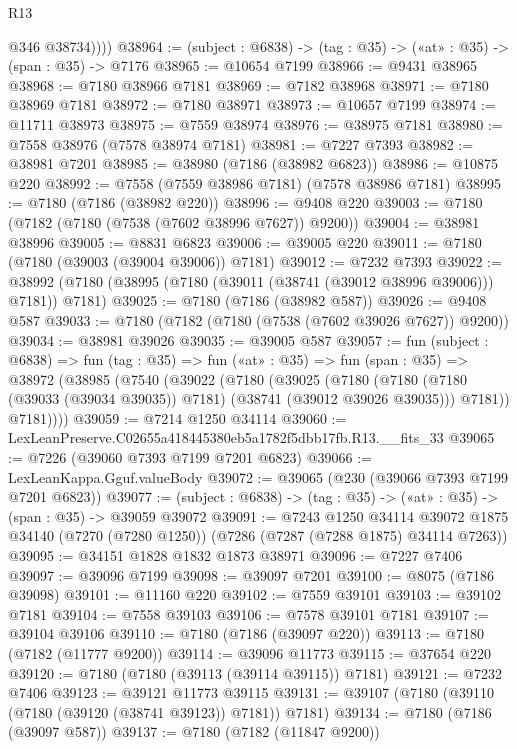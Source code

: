 \begin{lexlean}{R13}
\begin{coremodule}
            @346
            @38734))))
@38964 := (subject : @6838) -> (tag : @35) -> («at» : @35) -> (span : @35) -> @7176
@38965 := @10654 @7199
@38966 := @9431 @38965
@38968 := @7180 @38966 @7181
@38969 := @7182 @38968
@38971 := @7180 @38969 @7181
@38972 := @7180 @38971
@38973 := @10657 @7199
@38974 := @11711 @38973
@38975 := @7559 @38974
@38976 := @38975 @7181
@38980 := @7558 @38976 (@7578 @38974 @7181)
@38981 := @7227 @7393
@38982 := @38981 @7201
@38985 := @38980 (@7186 (@38982 @6823))
@38986 := @10875 @220
@38992 := @7558 (@7559 @38986 @7181) (@7578 @38986 @7181)
@38995 := @7180 (@7186 (@38982 @220))
@38996 := @9408 @220
@39003 := @7180 (@7182 (@7180 (@7538 (@7602 @38996 @7627)) @9200))
@39004 := @38981 @38996
@39005 := @8831 @6823
@39006 := @39005 @220
@39011 := @7180 (@7180 (@39003 (@39004 @39006)) @7181)
@39012 := @7232 @7393
@39022 := @38992 (@7180 (@38995 (@7180 (@39011 (@38741 (@39012 @38996 @39006))) @7181)) @7181)
@39025 := @7180 (@7186 (@38982 @587))
@39026 := @9408 @587
@39033 := @7180 (@7182 (@7180 (@7538 (@7602 @39026 @7627)) @9200))
@39034 := @38981 @39026
@39035 := @39005 @587
@39057 := fun (subject : @6838) =>
  fun (tag : @35) =>
  fun («at» : @35) =>
  fun (span : @35) =>
  @38972
    (@38985
      (@7540
        (@39022
          (@7180
            (@39025
              (@7180
                (@7180 (@7180 (@39033 (@39034 @39035)) @7181) (@38741 (@39012 @39026 @39035)))
                @7181))
            @7181))))
@39059 := @7214 @1250 @34114
@39060 := LexLeanPreserve.C02655a418445380eb5a1782f5dbb17fb.R13.__fits_33
@39065 := @7226 (@39060 @7393 @7199 @7201 @6823)
@39066 := LexLeanKappa.Gguf.valueBody
@39072 := @39065 (@230 (@39066 @7393 @7199 @7201 @6823))
@39077 := (subject : @6838) -> (tag : @35) -> («at» : @35) -> (span : @35) -> @39059 @39072
@39091 := @7243
    @1250
    @34114
    @39072
    @1875
    @34140
    (@7270 (@7280 @1250))
    (@7286 (@7287 (@7288 @1875) @34114 @7263))
@39095 := @34151 @1828 @1832 @1873 @38971
@39096 := @7227 @7406
@39097 := @39096 @7199
@39098 := @39097 @7201
@39100 := @8075 (@7186 @39098)
@39101 := @11160 @220
@39102 := @7559 @39101
@39103 := @39102 @7181
@39104 := @7558 @39103
@39106 := @7578 @39101 @7181
@39107 := @39104 @39106
@39110 := @7180 (@7186 (@39097 @220))
@39113 := @7180 (@7182 (@11777 @9200))
@39114 := @39096 @11773
@39115 := @37654 @220
@39120 := @7180 (@7180 (@39113 (@39114 @39115)) @7181)
@39121 := @7232 @7406
@39123 := @39121 @11773 @39115
@39131 := @39107 (@7180 (@39110 (@7180 (@39120 (@38741 @39123)) @7181)) @7181)
@39134 := @7180 (@7186 (@39097 @587))
@39137 := @7180 (@7182 (@11847 @9200))

\end{coremodule}
\end{lexlean}
